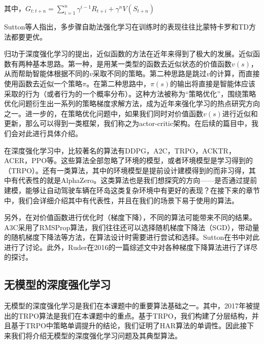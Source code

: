       \par 其中，$G_{t:t+n} = \sum_{i = 1}^{n}\gamma^{i-1}R_{t+i} + \gamma^n V(S_{t+n})$
      \par Sutton等人指出，多步骤自助法强化学习在训练时的表现往往比蒙特卡罗和TD方法都要更优\cite{Sutton_book}。
      \par 归功于深度强化学习的提出\cite{atari_2013}\cite{deepRL_overview}，近似函数的方法在近年来得到了极大的发展。近似函数有两种基本思路。第一种，是用某一类型的函数去近似状态的价值函数$v(s)$，从而帮助智能体根据不同的$v$采取不同的策略。第二种思路是跳过$v$的计算，而直接使用函数去近似一个策略$\pi$。在第二种思路中，$\pi(s)$的输出将直接是智能体应该采取的行为（或者行为的一个概率分布）。这种方法被称为``策略优化''，围绕策略优化问题衍生出一系列的策略梯度求解方法，成为近年来强化学习的热点研究方向之一。进一步的，在策略优化问题中，如果我们同时对价值函数$v(s)$进行近似和更新，那么可以得到一类框架，我们称之为actor-critic架构\cite{Sutton_book}。在后续的篇目中，我们会对此进行具体介绍。\par
      在深度强化学习中，比较著名的算法有DDPG\cite{DDPG}，A2C\cite{A3C}，TRPO\cite{TRPO}，ACKTR\cite{ACKTR}，ACER\cite{ACER}，PPO\cite{PPO}等。这些算法全部忽略了环境的模型，或者环境模型是学习得到的（TRPO）。还有一类算法，其中的环境模型是提前设计建模得到的而非习得，其中有代表性的就是AlphaZero\cite{AlphaZero}。这类算法也是我们想探究的方向——是否通过提前建模，能够让自动驾驶车辆在环岛这类复杂环境中有更好的表现？在接下来的章节中，我们会详细介绍其中有代表性，并且在我们的场景下易于使用的算法。\par
      另外，在对价值函数进行优化时（梯度下降），不同的算法可能带来不同的结果。A3C采用了RMSProp算法\cite{RMSProp}，我们往往还可以选择随机梯度下降法（SGD），带动量的随机梯度下降法\cite{SGD_momentum}等方法，在算法设计时需要进行尝试和选择。Sutton在书中对此进行了讨论\cite{Sutton_book}。此外，Ruder在2016的一篇综述文中对各种梯度下降算法进行了详尽的探讨\cite{GD_overview}。
      
    \subsection{无模型的深度强化学习}
      无模型的深度强化学习是我们在本课题中的重要算法基础之一。其中，2017年被提出的TRPO算法\cite{TRPO}是我们在本课题中的重点。基于TRPO，我们构建了分层结构，并且基于TRPO中策略单调提升的结论，我们证明了HAR算法的单调性。因此接下来我们将介绍无模型的深度强化学习问题及其典型算法。
      
